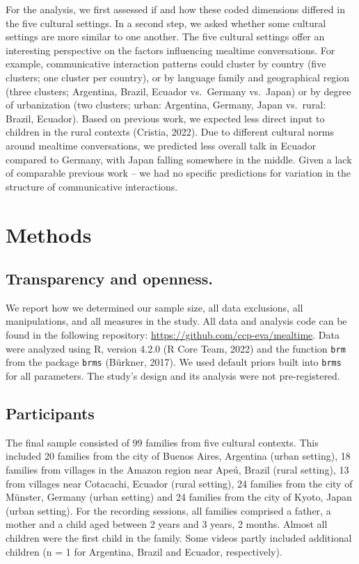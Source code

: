 \documentclass[
  man,floatsintext]{apa6}
\begin{document}
For the analysis, we first assessed if and how these coded dimensions differed in the five cultural settings. In a second step, we asked whether some cultural settings are more similar to one another. The five cultural settings offer an interesting perspective on the factors influencing mealtime conversations. For example, communicative interaction patterns could cluster by country (five clusters; one cluster per country), or by language family and geographical region (three clusters; Argentina, Brazil, Ecuador vs.~Germany vs.~Japan) or by degree of urbanization (two clusters; urban: Argentina, Germany, Japan vs.~rural: Brazil, Ecuador). Based on previous work, we expected less direct input to children in the rural contexts (Cristia, 2022). Due to different cultural norms around mealtime conversations, we predicted less overall talk in Ecuador compared to Germany, with Japan falling somewhere in the middle. Given a lack of comparable previous work -- we had no specific predictions for variation in the structure of communicative interactions.

\hypertarget{methods}{%
\section{Methods}\label{methods}}

\hypertarget{transparency-and-openness.}{%
\subsection{Transparency and openness.}\label{transparency-and-openness.}}

We report how we determined our sample size, all data exclusions, all manipulations, and all measures in the study. All data and analysis code can be found in the following repository: \url{https://github.com/ccp-eva/mealtime}. Data were analyzed using R, version 4.2.0 (R Core Team, 2022) and the function \texttt{brm} from the package \texttt{brms} (Bürkner, 2017). We used default priors built into \texttt{brms} for all parameters. The study's design and its analysis were not pre-registered.

\hypertarget{participants}{%
\subsection{Participants}\label{participants}}

The final sample consisted of 99 families from five cultural contexts. This included 20 families from the city of Buenos Aires, Argentina (urban setting), 18 families from villages in the Amazon region near Apeú, Brazil (rural setting), 13 from villages near Cotacachi, Ecuador (rural setting), 24 families from the city of Münster, Germany (urban setting) and 24 families from the city of Kyoto, Japan (urban setting). For the recording sessions, all families comprised a father, a mother and a child aged between 2 years and 3 years, 2 months. Almost all children were the first child in the family. Some videos partly included additional children (n = 1 for Argentina, Brazil and Ecuador, respectively).
\end{document}
